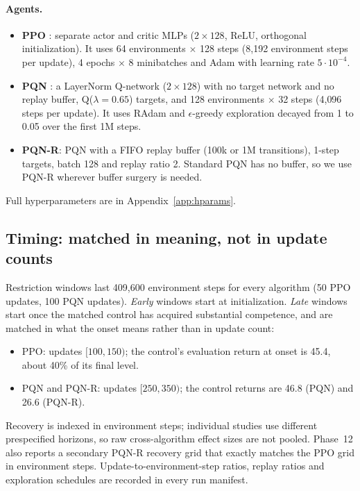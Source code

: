 \documentclass[10pt]{article} %
\begin{document}
\paragraph{Agents.}
\begin{itemize}
\item \textbf{PPO} \citep{schulman2017ppo}: separate actor and critic MLPs ($2\times128$, ReLU, orthogonal initialization). It uses 64 environments $\times$ 128 steps (8{,}192 environment steps per update), 4 epochs $\times$ 8 minibatches and Adam with learning rate $5\cdot10^{-4}$.
\item \textbf{PQN} \citep{gallici2025pqn}: a LayerNorm Q-network ($2\times128$) with no target network and no replay buffer, Q($\lambda{=}0.65$) targets, and 128 environments $\times$ 32 steps (4{,}096 steps per update). It uses RAdam \citep{liu2019radam} and $\epsilon$-greedy exploration decayed from 1 to 0.05 over the first 1M steps.
\item \textbf{PQN-R}: PQN with a FIFO replay buffer (100k or 1M transitions), 1-step targets, batch 128 and replay ratio 2. Standard PQN has no buffer, so we use PQN-R wherever buffer surgery is needed.
\end{itemize}
Full hyperparameters are in Appendix~\ref{app:hparams}.

\subsection{Timing: matched in meaning, not in update counts}
Restriction windows last 409{,}600 environment steps for every algorithm (50 PPO updates, 100 PQN updates). \emph{Early} windows start at initialization. \emph{Late} windows start once the matched control has acquired substantial competence, and are matched in what the onset means rather than in update count:
\begin{itemize}
\item PPO: updates $[100,150)$; the control's evaluation return at onset is 45.4, about 40\% of its final level.
\item PQN and PQN-R: updates $[250,350)$; the control returns are 46.8 (PQN) and 26.6 (PQN-R).
\end{itemize}
Recovery is indexed in environment steps; individual studies use different prespecified horizons, so raw cross-algorithm effect sizes are not pooled. Phase~12 also reports a secondary PQN-R recovery grid that exactly matches the PPO grid in environment steps. Update-to-environment-step ratios, replay ratios and exploration schedules are recorded in every run manifest.
\end{document}
